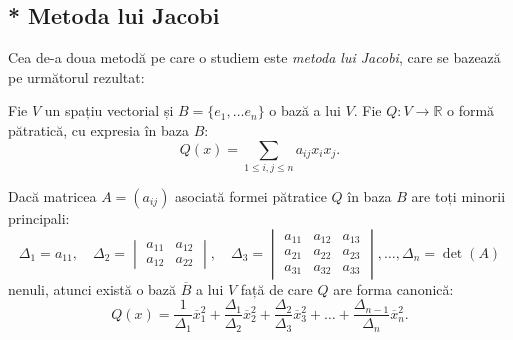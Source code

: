 
\subsection{* Metoda lui Jacobi}

\indent\indent Cea de-a doua metodă pe care o studiem este \emph{metoda lui
Jacobi}, care se bazează pe următorul rezultat:
\begin{theorem}
	Fie $V$ un spațiu vectorial și $B = \{e_1, \dots e_n\}$ o bază a lui $V$.
Fie $Q : V \to \mathbb{R}$ o formă pătratică, cu expresia în baza $B$: 
 \[
	Q(x) = \sum_{1 \leq i, j \leq n} a_{ij} x_i x_j.
\]

Dacă matricea $A = (a_{ij})$ asociată formei pătratice $Q$ în baza $B$ are toți
minorii principali: 
 \[
	\Delta_1 = a_{11}, \quad \Delta_2 = \begin{vmatrix}
	                                        a_{11} & a_{12} \\
	                                        a_{12} & a_{22}
                                        \end{vmatrix}, \quad
    \Delta_3 = \begin{vmatrix}
	               a_{11} & a_{12} & a_{13} \\
	               a_{21} & a_{22} & a_{23} \\
	               a_{31} & a_{32} & a_{33}
               \end{vmatrix}, \dots, \Delta_n = \det(A)
\]
nenuli, atunci există o bază $\overline{B}$ a lui $V$ față de care $Q$ are
forma canonică: 
 \[
	Q(x) = \dfrac{1}{\Delta_1} \overline{x}_1^2 + \dfrac{\Delta_1}{\Delta_2}
	        \overline{x}_2^2 + \dfrac{\Delta_2}{\Delta_3} \overline{x}_3^2 +
	        \dots + \dfrac{\Delta_{n-1}}{\Delta_n} \overline{x}_n^2.
\]
\end{theorem}


